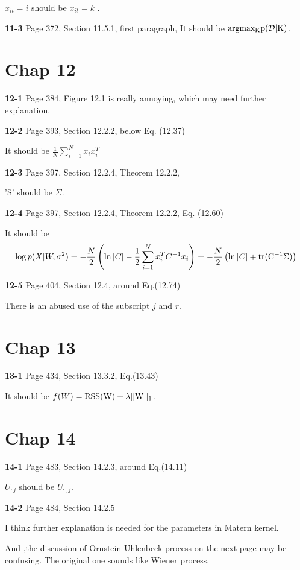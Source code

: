 \documentclass[aps,preprint,a4]{revtex4-1}
\newcommand{\nl}{\nonumber \\}
\begin{document}
$x_{it}=i$ should be $x_{it}=k$ .

{\color{red}\textbf{11-3}} Page 372, Section 11.5.1, first paragraph,
It should be $\rm argmax_{K}p(\mathcal D|K)$.


\section{Chap 12}
{\color{red}\textbf{12-1}} Page 384, Figure 12.1 is really annoying, which may need
further explanation.

{\color{red}\textbf{12-2}} Page 393, Section 12.2.2, below Eq. (12.37)

It should be $\frac{1}{N}\sum_{i=1}^{N}x_{i}x_{i}^{T}$

{\color{red}\textbf{12-3}} Page 397, Section 12.2.4, Theorem 12.2.2,

'S' should be $\Sigma$.

{\color{red}\textbf{12-4}} Page 397, Section 12.2.4, Theorem 12.2.2, Eq. (12.60)

It should be
\begin{equation}
\log p(X|W,\sigma^{2}) = -\frac{N}{2}\left(\ln |C|-\frac{1}{2}\sum_{i=1}^{N}x_{i}^{T}C^{-1}x_{i}\right)
=  -\frac{N}{2}\left(\ln |C|+\rm tr(C^{-1}\Sigma)\right)\nl
\end{equation}

{\color{red}\textbf{12-5}} Page 404, Section 12.4, around Eq.(12.74)

There is an abused use of the subscript $j$ and $r$.

\section{Chap 13}
{\color{red}\textbf{13-1}} Page 434, Section 13.3.2, Eq.(13.43)

It should be $f(W) = \rm RSS(W) + \lambda||W||_{1}$.


\section{Chap 14}
{\color{red}\textbf{14-1}} Page 483, Section 14.2.3, around Eq.(14.11)

$U_{:j}$ should be $U_{:,j}$.

{\color{red}\textbf{14-2}} Page 484, Section 14.2.5

I think further explanation is needed for the parameters in Matern kernel.

And ,the discussion of Ornstein-Uhlenbeck process on the next page may be confusing.
The original one sounds like Wiener process.
\end{document}
